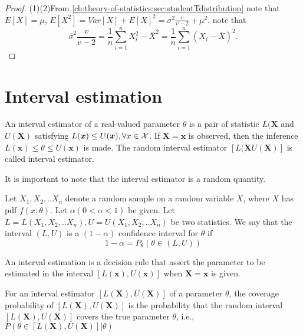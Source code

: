 \begin{refsection}
\begin{lemma}
\end{lemma}
\begin{proof}
(1)(2)From \autoref{ch:theory-of-statistics:sec:studentTdistribution} note that $E[X] = \mu$, $E[X^2] = Var[X] + E[X]^2 = \sigma^2\frac{v}{v-2} + \mu^2$.
note that 
$$\hat{\sigma}^2\frac{v}{v-2} = \frac{1}{n}\sum_{i=1}^n X_i^2 - \bar{X}^2 = \frac{1}{n}\sum_{i=1}^n (X_i - \bar{X})^2.$$
\end{proof}




\section{Interval estimation}
\begin{definition}
	\cite[418]{casella2002statistical}
	An interval estimator of a real-valued parameter $\theta$ is a pair of statistic $L(\bm{X}$ and $U(\bm{X})$ satisfying $L(\bm{x}) \leq U(\bm{x}),\forall x\in \mathcal{X}$. If $\bm{X}=\bm{x}$ is observed, then the inference $L(\bm{x}) \leq\theta \leq U(\bm{x})$ is made. The random interval estimator $[L(\bm{X} U(\bm{X})]$ is called interval estimator.  
\end{definition}

\begin{remark}
	It is important to note that the interval estimator is a random quantity.
\end{remark}

\begin{definition}
	Let $X_1,X_2,..X_n$ denote a random sample on a random variable $X$, where $X$ has pdf $f(x;\theta)$. Let $\alpha (0 < \alpha < 1)$ be given. Let $L=L(X_1,X_2,..X_n), U = U(X_1,X_2,..X_n)$ be two statistics. We say that the interval $(L,U)$ is a $(1-\alpha)$ confidence interval for $\theta$ if
	$$1-\alpha = P_{\theta}(\theta\in (L,U))$$
\end{definition}




\begin{definition}
	An interval estimation is a decision rule that assert the parameter to be estimated in the interval $[L(\bm{x}),U(\bm{x})]$ when $\bm{X}=\bm{x}$ is given. 
\end{definition}

\begin{definition}
	\cite[418]{casella2002statistical} For an interval estimator $[L(\bm{X}),U(\bm{X})]$ of a parameter $\theta$, the coverage probability of $[L(\bm{X}),U(\bm{X})]$ is the probability that the random interval $[L(\bm{X}),U(\bm{X})]$ covers the true parameter $\theta$, i.e., $P(\theta\in [L(\bm{X}),U(\bm{X})]|\theta)$
\end{definition}


\end{refsection}

